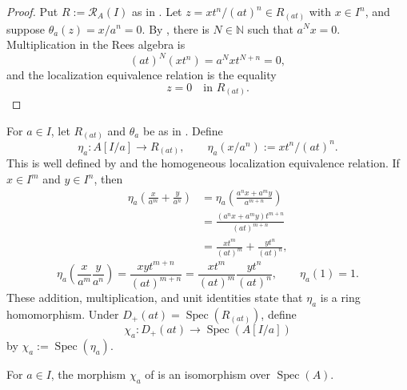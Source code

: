 \begin{proof}
  Put $R:=\mathcal R_A(I)$ as in
  .  Let
  $z=xt^n/(at)^n\in R_{(at)}$ with $x\in I^n$, and suppose
  $\theta_a(z)=x/a^n=0$.  By
  , there is
  $N\in\mathbb N$ such that $a^Nx=0$.  Multiplication in the Rees algebra is
  \[
    (at)^N(xt^n)=a^Nxt^{N+n}=0,
  \]
  and the localization equivalence relation is the equality
  \[
    z=0\quad\text{in }R_{(at)}.
  \]
\end{proof}

\begin{definition}
  \label{def:nagata-affine-blowup-chart-map}
  \lean{}

  For $a\in I$, let $R_{(at)}$ and $\theta_a$ be as in
  .  Define
  \[
    \eta_a\colon A[I/a]\longrightarrow R_{(at)},
    \qquad \eta_a(x/a^n):=xt^n/(at)^n.
  \]
  This is well defined by
   and the homogeneous
  localization equivalence relation.  If $x\in I^m$ and $y\in I^n$, then
  \[
  \begin{aligned}
    \eta_a\left(\frac{x}{a^m}+\frac{y}{a^n}\right)
      &=\eta_a\left(\frac{a^nx+a^my}{a^{m+n}}\right)\\
      &=\frac{(a^nx+a^my)t^{m+n}}{(at)^{m+n}}\\
      &=\frac{xt^m}{(at)^m}+\frac{yt^n}{(at)^n},
  \end{aligned}
  \]
  \[
    \eta_a\left(\frac{x}{a^m}\frac{y}{a^n}\right)
      =\frac{xyt^{m+n}}{(at)^{m+n}}
      =\frac{xt^m}{(at)^m}\frac{yt^n}{(at)^n},
    \qquad \eta_a(1)=1.
  \]
  These addition, multiplication, and unit identities state that
  $\eta_a$ is a ring homomorphism.  Under
  $D_+(at)=\operatorname{Spec}(R_{(at)})$, define
  \[
    \chi_a\colon D_+(at)\longrightarrow\operatorname{Spec}(A[I/a])
  \]
  by $\chi_a:=\operatorname{Spec}(\eta_a)$.
\end{definition}

\begin{proposition}
  \label{prop:nagata-affine-blowup-chart}
  \lean{}

  For $a\in I$, the morphism $\chi_a$ of
   is an
  isomorphism over
  $\operatorname{Spec}(A)$.
\end{proposition}

